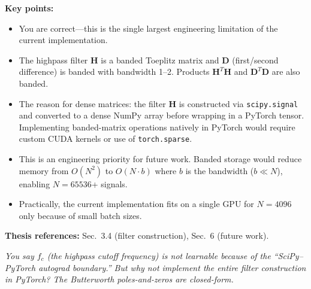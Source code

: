 \documentclass[11pt, letterpaper]{article}
\newcounter{qcounter}
\newcommand{\question}[1]{%
  \stepcounter{qcounter}%
  \begin{questionbox}[Q\theqcounter]%
    \itshape #1%
  \end{questionbox}%
}
\begin{document}
\begin{answerbox}
\textbf{Key points:}
\begin{itemize}[nosep]
  \item You are correct---this is the single largest engineering
        limitation of the current implementation.
  \item The highpass filter $\mathbf{H}$ is a banded Toeplitz matrix
        and $\mathbf{D}$ (first/second difference) is banded with
        bandwidth 1--2.  Products $\mathbf{H}^T\mathbf{H}$ and
        $\mathbf{D}^T\mathbf{D}$ are also banded.
  \item The reason for dense matrices: the filter $\mathbf{H}$ is
        constructed via \texttt{scipy.signal} and converted to a dense
        NumPy array before wrapping in a PyTorch tensor.  Implementing
        banded-matrix operations natively in PyTorch would require
        custom CUDA kernels or use of \texttt{torch.sparse}.
  \item This is an engineering priority for future work.  Banded storage
        would reduce memory from $O(N^2)$ to $O(N \cdot b)$ where $b$
        is the bandwidth ($b \ll N$), enabling $N{=}65536$+ signals.
  \item Practically, the current implementation fits on a single GPU
        for $N{=}4096$ only because of small batch sizes.
\end{itemize}
\textbf{Thesis references:} Sec.~3.4 (filter construction), Sec.~6 (future work).
\end{answerbox}

\question{You say $f_c$ (the highpass cutoff frequency) is not learnable
because of the ``SciPy--PyTorch autograd boundary.''  But why not
implement the entire filter construction in PyTorch?  The
Butterworth poles-and-zeros are closed-form.}
\end{document}
